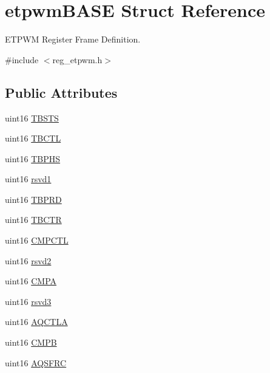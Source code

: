 \hypertarget{structetpwmBASE}{}\section{etpwm\+B\+A\+SE Struct Reference}
\label{structetpwmBASE}


E\+T\+P\+WM Register Frame Definition.  




{\ttfamily \#include $<$reg\+\_\+etpwm.\+h$>$}

\subsection*{Public Attributes}
\begin{DoxyCompactItemize}
\item 
uint16 \mbox{\hyperlink{structetpwmBASE_ae041121b40c53260426f11aed6f8f8ef}{T\+B\+S\+TS}}
\item 
uint16 \mbox{\hyperlink{structetpwmBASE_a31d552a441cd8839de6c5977d3a3089c}{T\+B\+C\+TL}}
\item 
uint16 \mbox{\hyperlink{structetpwmBASE_a8bade60a48e3c6df6bc762d99917b2d3}{T\+B\+P\+HS}}
\item 
uint16 \mbox{\hyperlink{structetpwmBASE_ab43be32a68026e0314c5a1b427456a4f}{rsvd1}}
\item 
uint16 \mbox{\hyperlink{structetpwmBASE_a17f25e1aeadd46e29779c042f38f9ee1}{T\+B\+P\+RD}}
\item 
uint16 \mbox{\hyperlink{structetpwmBASE_a5d83fc39484fd285efcac355ff50a4d2}{T\+B\+C\+TR}}
\item 
uint16 \mbox{\hyperlink{structetpwmBASE_ad7e7166effaca40d92dc7b3d3bb11453}{C\+M\+P\+C\+TL}}
\item 
uint16 \mbox{\hyperlink{structetpwmBASE_ab16078e7a154740052c3554779dc6eaa}{rsvd2}}
\item 
uint16 \mbox{\hyperlink{structetpwmBASE_aafdb25349ba6b1c78fea4f555475473d}{C\+M\+PA}}
\item 
uint16 \mbox{\hyperlink{structetpwmBASE_a0c55402db4d574c329b0cfd8f39c6096}{rsvd3}}
\item 
uint16 \mbox{\hyperlink{structetpwmBASE_af1296fe251cb0eee1888b4e57b0f3b86}{A\+Q\+C\+T\+LA}}
\item 
uint16 \mbox{\hyperlink{structetpwmBASE_a5a257a399f4a59cf217145e1c39edabb}{C\+M\+PB}}
\item 
uint16 \mbox{\hyperlink{structetpwmBASE_aca7ec69e92033e9e8e192859ecc8fbfc}{A\+Q\+S\+F\+RC}}
\item 

\end{DoxyCompactItemize}
